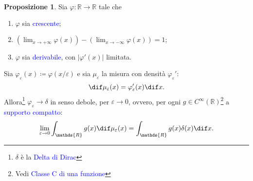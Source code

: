 \documentclass[10pt]{book}
\newcommand{\1}{\mathds{1}}
\newcommand{\R}{\mathds{R}}
\theoremstyle{definition}%
\newtheorem{prop}[thm]{Proposizione}
\theoremstyle{plain}
\theoremstyle{remark}
\renewcommand{\href}[2]{\textcolor{blue}{#2}}
\begin{document}
\begin{prop}
Sia \(\varphi:\R\to \R\) tale che
\begin{enumerate}
\item \(\varphi\) sia \href{../../../../../org/roam/20250203132953-funzione_monotona.org}{crescente};
\item \((\lim_{x\to+\infty}\varphi(x))-(\lim_{x\to-\infty}\varphi(x)) = 1\);
\item \(\varphi\) sia \href{../../../../../org/roam/20250627155431-funzione_derivabile.org}{derivabile}, con \(|\varphi'(x)|\) limitata.
\end{enumerate}

Sia \(\varphi_{\varepsilon}(x) \coloneqq \varphi(x/\varepsilon)\) e sia \(\mu_{\varepsilon}\) la misura con densità \(\varphi_{\varepsilon}'\):
\begin{equation*}
\dif\mu_{\varepsilon}(x) = \varphi_{\varepsilon}'(x)\dif x.
\end{equation*}
Allora\footnote{\(\delta\) è la \href{../../../../../org/roam/20250625100133-delta_di_dirac.org}{Delta di Dirac}} \(\varphi_{\varepsilon}\to \delta\) in senso debole, per \(\varepsilon\to 0\), ovvero, per ogni \(g \in C^{\infty}(\R)\)\footnote{Vedi \href{../../../../../org/roam/20250113125602-classe_c_di_una_funzione.org}{Classe C di una funzione}} a \href{../../../../../org/roam/20250701115005-supporto_di_una_funzione.org}{supporto} \href{../../../../../org/roam/20250103163701-spazio_topologico_compatto.org}{compatto}:
\begin{equation*}
\lim_{\varepsilon\to 0} \int_{\R} g(x)\dif \mu_{\varepsilon}(x) = \int_{\R} g(x)\delta(x)\dif x.
\end{equation*}
\end{prop}
\end{document}
